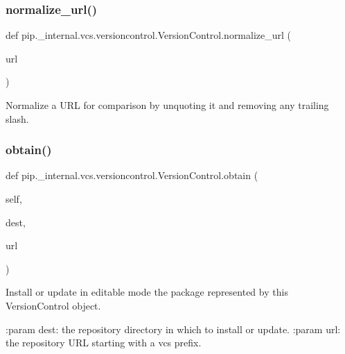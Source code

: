 \subsubsection{\texorpdfstring{normalize\+\_\+url()}{normalize\_url()}}
{\footnotesize\ttfamily def pip.\+\_\+internal.\+vcs.\+versioncontrol.\+Version\+Control.\+normalize\+\_\+url (\begin{DoxyParamCaption}\item[{}]{url }\end{DoxyParamCaption})\hspace{0.3cm}{\ttfamily [static]}}

\begin{DoxyVerb}Normalize a URL for comparison by unquoting it and removing any
trailing slash.
\end{DoxyVerb}
 \mbox{\label{classpip_1_1__internal_1_1vcs_1_1versioncontrol_1_1VersionControl_a6cd1dc22e3948b839e553cefb9e56c18}} 
\subsubsection{\texorpdfstring{obtain()}{obtain()}}
{\footnotesize\ttfamily def pip.\+\_\+internal.\+vcs.\+versioncontrol.\+Version\+Control.\+obtain (\begin{DoxyParamCaption}\item[{}]{self,  }\item[{}]{dest,  }\item[{}]{url }\end{DoxyParamCaption})}

\begin{DoxyVerb}Install or update in editable mode the package represented by this
VersionControl object.

:param dest: the repository directory in which to install or update.
:param url: the repository URL starting with a vcs prefix.
\end{DoxyVerb}
 \mbox{\label{classpip_1_1__internal_1_1vcs_1_1versioncontrol_1_1VersionControl_a0cd4df4ca2aaa3a020caf990e4142b91}} 

